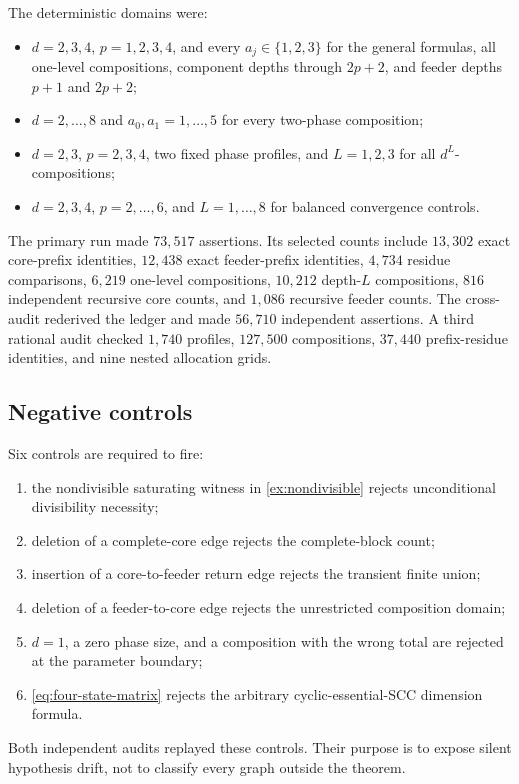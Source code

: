 The deterministic domains were:
\begin{itemize}
  \item $d=2,3,4$, $p=1,2,3,4$, and every $a_j\in\{1,2,3\}$ for the general
  formulas, all one-level compositions, component depths through $2p+2$, and
  feeder depths $p+1$ and $2p+2$;
  \item $d=2,\ldots,8$ and $a_0,a_1=1,\ldots,5$ for every two-phase
  composition;
  \item $d=2,3$, $p=2,3,4$, two fixed phase profiles, and $L=1,2,3$ for all
  $d^L$-compositions;
  \item $d=2,3,4$, $p=2,\ldots,6$, and $L=1,\ldots,8$ for balanced
  convergence controls.
\end{itemize}
The primary run made $73{,}517$ assertions.  Its selected counts include
$13{,}302$ exact core-prefix identities, $12{,}438$ exact feeder-prefix
identities, $4{,}734$ residue comparisons, $6{,}219$ one-level compositions,
$10{,}212$ depth-$L$ compositions, $816$ independent recursive core counts,
and $1{,}086$ recursive feeder counts.  The cross-audit rederived the ledger
and made $56{,}710$ independent assertions.  A third rational audit checked
$1{,}740$ profiles, $127{,}500$ compositions, $37{,}440$ prefix-residue
identities, and nine nested allocation grids.

\subsection{Negative controls}

Six controls are required to fire:
\begin{enumerate}
  \item the nondivisible saturating witness in \cref{ex:nondivisible} rejects
  unconditional divisibility necessity;
  \item deletion of a complete-core edge rejects the complete-block count;
  \item insertion of a core-to-feeder return edge rejects the transient finite
  union;
  \item deletion of a feeder-to-core edge rejects the unrestricted
  composition domain;
  \item $d=1$, a zero phase size, and a composition with the wrong total are
  rejected at the parameter boundary;
  \item \cref{eq:four-state-matrix} rejects the arbitrary cyclic-essential-SCC dimension
  formula.
\end{enumerate}
Both independent audits replayed these controls.  Their purpose is to expose
silent hypothesis drift, not to classify every graph outside the theorem.

